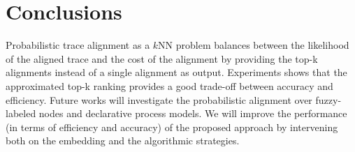 \section{Conclusions}
\label{sec:conclusion}

Probabilistic trace alignment as a $k$NN problem
balances between the likelihood of the aligned trace and the cost of the alignment by providing the top-k alignments instead of a single alignment as output.  Experiments shows that the approximated top-k ranking provides a good trade-off between accuracy and efficiency. %
Future works will investigate the probabilistic alignment over fuzzy-labeled nodes and declarative process models. We will  improve the performance (in terms of efficiency and accuracy) of the proposed approach by intervening both on the embedding and the algorithmic strategies.


%
%


